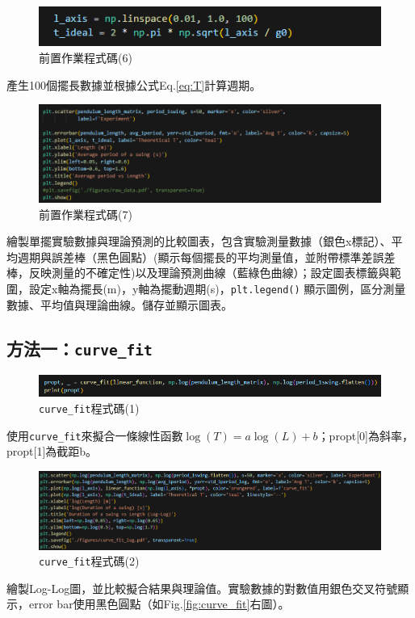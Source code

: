 \documentclass[12pt,a4paper]{article}
\begin{document}
\begin{CJK}{UTF8}{bkai}
\clearpage

\begin{figure}[h]
    \centering
    \includegraphics[width=1\linewidth]{FD6.png}
    \caption{前置作業程式碼(6)}
    \label{fig:FD6}
\end{figure}
\indent 產生100個擺長數據並根據公式Eq.\ref{eq:T}計算週期。

\begin{figure}[h]
    \centering
    \includegraphics[width=1\linewidth]{FD7.png}
    \caption{前置作業程式碼(7)}
    \label{fig:FD7}
\end{figure}
\indent 繪製單擺實驗數據與理論預測的比較圖表，包含實驗測量數據（銀色x標記）、平均週期與誤差棒（黑色圓點）(顯示每個擺長的平均測量值，並附帶標準差誤差棒，反映測量的不確定性)以及理論預測曲線（藍綠色曲線）；設定圖表標籤與範圍，設定x軸為擺長(m)，y軸為擺動週期(s)，\texttt{plt.legend()} 顯示圖例，區分測量數據、平均值與理論曲線。儲存並顯示圖表。

\clearpage

\subsection{方法一：\texttt{curve\_fit}}
\hfill

\begin{figure}[h]
    \centering
    \includegraphics[width=1\linewidth]{curve1.png}
    \caption{\texttt{curve\_fit}程式碼(1)}
    \label{fig:curve_fit1}
\end{figure}
\indent 使用\texttt{curve\_fit}來擬合一條線性函數$\log(T)=a\log(L)+b$；propt[0]為斜率，propt[1]為截距b。

\begin{figure}[h]
    \centering
    \includegraphics[width=1\linewidth]{curve2.png}
    \caption{\texttt{curve\_fit}程式碼(2)}
    \label{fig:curve_fit2}
\end{figure}
\indent 繪製Log-Log圖，並比較擬合結果與理論值。實驗數據的對數值用銀色交叉符號顯示，error bar使用黑色圓點（如Fig.\ref{fig:curve_fit}右圖）。


\end{CJK}
\end{document}
